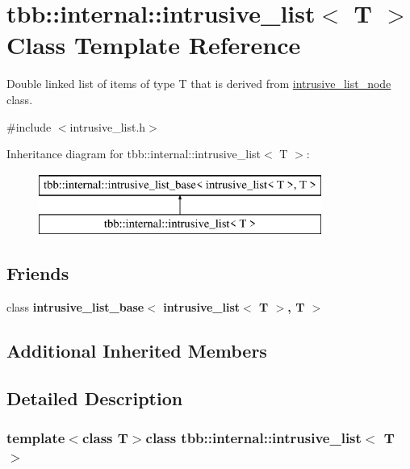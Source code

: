 \hypertarget{classtbb_1_1internal_1_1intrusive__list}{}\section{tbb\+:\+:internal\+:\+:intrusive\+\_\+list$<$ T $>$ Class Template Reference}
\label{classtbb_1_1internal_1_1intrusive__list}


Double linked list of items of type T that is derived from \hyperlink{structtbb_1_1internal_1_1intrusive__list__node}{intrusive\+\_\+list\+\_\+node} class.  




{\ttfamily \#include $<$intrusive\+\_\+list.\+h$>$}

Inheritance diagram for tbb\+:\+:internal\+:\+:intrusive\+\_\+list$<$ T $>$\+:\begin{figure}[H]
\begin{center}
\leavevmode
\includegraphics[height=2.000000cm]{classtbb_1_1internal_1_1intrusive__list}
\end{center}
\end{figure}
\subsection*{Friends}
\begin{DoxyCompactItemize}
\item 
\hypertarget{classtbb_1_1internal_1_1intrusive__list_a0aa898d82d3bf2297bf0b5dc034c568e}{}class {\bfseries intrusive\+\_\+list\+\_\+base$<$ intrusive\+\_\+list$<$ T $>$, T $>$}\label{classtbb_1_1internal_1_1intrusive__list_a0aa898d82d3bf2297bf0b5dc034c568e}

\end{DoxyCompactItemize}
\subsection*{Additional Inherited Members}


\subsection{Detailed Description}
\subsubsection*{template$<$class T$>$class tbb\+::internal\+::intrusive\+\_\+list$<$ T $>$}

